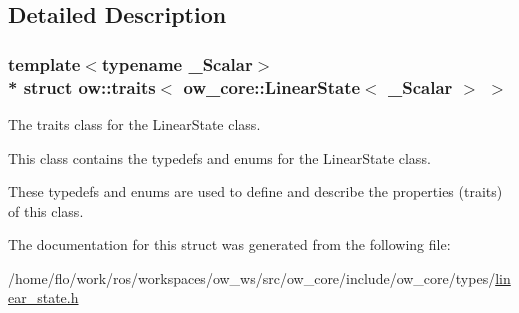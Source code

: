 \subsection{Detailed Description}
\subsubsection*{template$<$typename \+\_\+\+Scalar$>$\\*
struct ow\+::traits$<$ ow\+\_\+core\+::\+Linear\+State$<$ \+\_\+\+Scalar $>$ $>$}

The traits class for the Linear\+State class. 

This class contains the typedefs and enums for the Linear\+State class.

These typedefs and enums are used to define and describe the properties (traits) of this class. 

The documentation for this struct was generated from the following file\+:\begin{DoxyCompactItemize}
\item 
/home/flo/work/ros/workspaces/ow\+\_\+ws/src/ow\+\_\+core/include/ow\+\_\+core/types/\hyperlink{linear__state_8h}{linear\+\_\+state.\+h}\end{DoxyCompactItemize}
